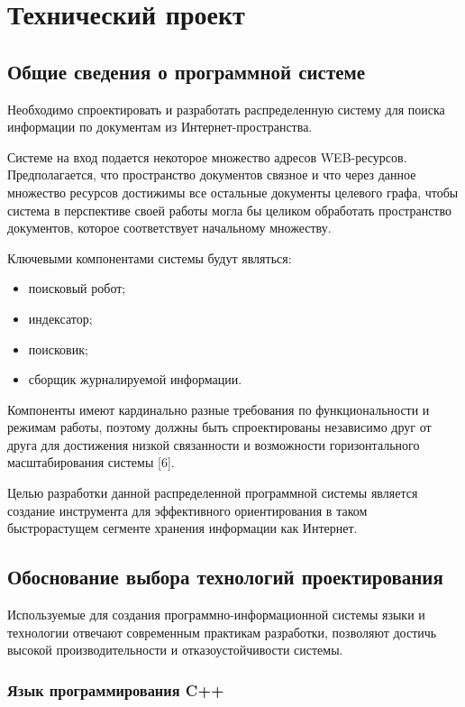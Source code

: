 \section{Технический проект}

\subsection{Общие сведения о программной системе}
Необходимо спроектировать и разработать распределенную систему для поиска информации по документам из Интернет-пространства.

Системе на вход подается некоторое множество адресов WEB-ресурсов.
Предполагается, что пространство документов связное и что через данное множество ресурсов достижимы все остальные документы целевого графа, чтобы система в перспективе своей работы могла бы целиком обработать пространство документов, которое соответствует начальному множеству.

Ключевыми компонентами системы будут являться:
\begin{itemize}
\item поисковый робот;
\item индексатор;
\item поисковик;
\item сборщик журналируемой информации.
\end{itemize}

Компоненты имеют кардинально разные требования по функциональности и режимам работы, поэтому должны быть спроектированы независимо друг от друга для достижения низкой связанности и возможности горизонтального масштабирования системы [6].

Целью разработки данной распределенной программной системы является создание инструмента для эффективного ориентирования в таком быстрорастущем сегменте хранения информации как Интернет.

\subsection{Обоснование выбора технологий проектирования}
Используемые для создания программно-информационной системы языки и технологии отвечают современным практикам разработки, позволяют достичь высокой производительности и отказоустойчивости системы.

\subsubsection{Язык программирования C++}

